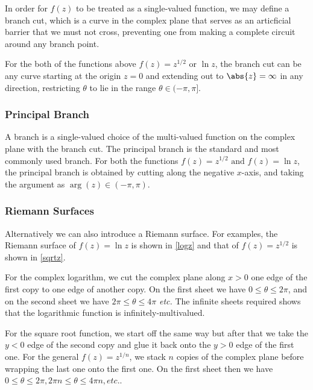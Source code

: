 \documentclass[english,a4paper,12pt]{report}
\begin{document}
In order for \(f(z)\) to be treated as a single-valued function, we may define a branch cut, which is a curve in the complex plane that serves as an articficial barrier that we must not cross, preventing one from making a complete circuit around any branch point. 

For the both of the functions above \(f(z) = z^{1/2} \text { or } \ln z\), the branch cut can be any curve starting at the origin \(z = 0\) and extending out to \(\abs{z} = \infty \) in any direction, restricting \(\theta \) to lie in the range \(\theta \in (-\pi ,\pi ]\). 

\subsubsection{Principal Branch}

A branch is a single-valued choice of the multi-valued function on the complex plane with the branch cut. The principal branch is the standard and most commonly used branch. For both the functions \(f(z) = z^{1 /2} \text { and }  f(z) = \ln z \), the principal branch is obtained by cutting along the negative \(x\)-axis, and taking the argument as \(\arg (z) \in (-\pi ,\pi )\).   

\subsubsection{Riemann Surfaces}

Alternatively we can also introduce a Riemann surface. For examples, the Riemann surface of \(f(z) = \ln z\) is shown in \cref{logz} and that of \(f(z) = z^{1 /2} \) is shown in \cref{sqrtz}.

For the complex logarithm, we cut the complex plane along \(x > 0\) one edge of the first copy to one edge of another copy. On the first sheet we have \(0 \le \theta \le 2\pi \), and on the second sheet we have \(2\pi \le \theta \le 4\pi \) \textit{etc.} The infinite sheets required shows that the logarithmic function is infinitely-multivalued.

For the square root function, we start off the same way but after that we take the \(y<0\) edge of the second copy and glue it back onto the \(y >0\) edge of the first one. For the general \(f(z) = z^{ 1/n} \), we stack \(n\) copies of the complex plane before wrapping the last one onto the first one. On the first sheet then we have \(0 \le \theta \le 2\pi , 2\pi n \le \theta \le 4\pi n, \textit{etc.} \).   

\end{document}
